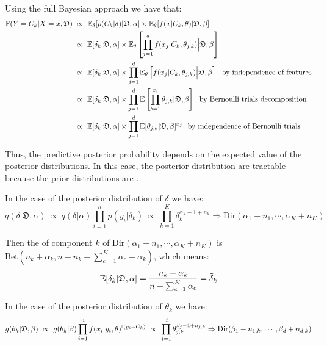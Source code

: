 Using the full Bayesian approach we have that:
\begin{align*}
    \operatorname{\mathbb{P}}(Y=C_k|X =x,\mathfrak{D})\
    &\propto\ \operatorname{\mathbb{E}}_{\delta}[p(C_k|\delta)|\mathfrak{D},\alpha]\times \operatorname{\mathbb{E}}_{\theta}[f(x|C_k,\theta)|\mathfrak{D},\beta] \\
    &\propto\ \operatorname{\mathbb{E}} [\delta_k|\mathfrak{D},\alpha] \times \operatorname{\mathbb{E}}_{\theta}\left[\prod_{j=1}^d  f(x_j|C_k,\theta_{j,k}) \Big|\mathfrak{D},\beta\right]\\
    &\propto\ \operatorname{\mathbb{E}} [\delta_k|\mathfrak{D},\alpha] \times \prod_{j=1}^d\operatorname{\mathbb{E}}_{\theta}\left[  f(x_j|C_k,\theta_{j,k}) \Big|\mathfrak{D},\beta\right]\ \text{ by independence of features} \\
    &\propto\ \operatorname{\mathbb{E}} [\delta_k|\mathfrak{D},\alpha]\times\prod_{j=1}^d \operatorname{\mathbb{E}} \left[\prod_{b=1}^{x_j}\theta_{j,k}|\mathfrak{D},\beta\right]\ \text{ by Bernoulli trials decomposition}\\
    &\propto\ \operatorname{\mathbb{E}} [\delta_k|\mathfrak{D},\alpha]\times\prod_{j=1}^d \operatorname{\mathbb{E}} [\theta_{j,k}|\mathfrak{D},\beta]^{x_j}\ \text{ by independence of Bernoulli trials}
\end{align*}

Thus, the predictive posterior probability depends on the expected value of the posterior distributions. In this case, the posterior distribution are tractable because the prior distributions are .

In the case of the posterior distribution of $\delta$ we have:
\begin{equation*}
    q(\delta|\mathfrak{D},\alpha)\ \propto\ q(\delta|\alpha)\prod_{i=1}^n p(y_i|\delta_k)\ \propto\ \prod_{k=1}^K\delta_k^{\alpha_k-1+n_k}\Rightarrow \text{Dir}(\alpha_1+n_1,\cdots,\alpha_K+n_K)
\end{equation*}

Then the  of component $k$ of $\text{Dir}(\alpha_1+n_1,\cdots,\alpha_K+n_K)$ is $\text{Bet}(n_k+\alpha_k, n-n_k+\sum_{c=1}^K\alpha_c-\alpha_k)$, which means:
\begin{equation*}
    \operatorname{\mathbb{E}} [\delta_k|\mathfrak{D},\alpha] = \frac{n_k+\alpha_k}{n+\sum_{c=1}^K\alpha_c} = \Tilde{\delta}_k
\end{equation*}

In the case of the posterior distribution of $\theta_k$ we have:
\begin{equation*}
    g(\theta_k|\mathfrak{D},\beta)\  \propto\  g(\theta_k|\beta)\prod_{i=1}^n f(x_i|y_i,\theta)^{\operatorname{\mathbb{I}}(y_i=C_k)}\ \propto\ \prod_{j=1}^d \theta_{j,k}^{\beta_j-1+n_{j,k}}\Rightarrow \text{Dir}(\beta_1+n_{1,k},\cdots,\beta_d+n_{d,k})
\end{equation*}

